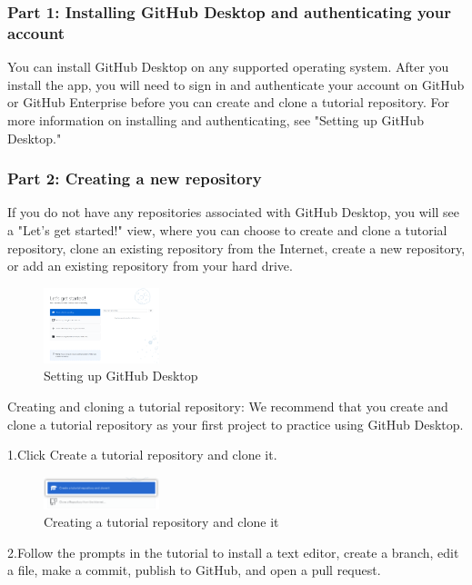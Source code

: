 \subsubsection{Part 1: Installing GitHub Desktop and authenticating your account}

You can install GitHub Desktop on any supported operating system. After you install the app, you will need to sign in and authenticate your account on GitHub or GitHub Enterprise before you can create and clone a tutorial repository.
For more information on installing and authenticating, see "Setting up GitHub Desktop."

\subsubsection{Part 2: Creating a new repository}

If you do not have any repositories associated with GitHub Desktop, you will see a "Let's get started!" view, where you can choose to create and clone a tutorial repository, clone an existing repository from the Internet, create a new repository, or add an existing repository from your hard drive.

\begin{figure}[ht]
    \centering
    \includegraphics[width=0.3\textwidth]{figures/Setting up GitHub Desktop.png}
    \caption{Setting up GitHub Desktop}
\end{figure}

Creating and cloning a tutorial repository:
We recommend that you create and clone a tutorial repository as your first project to practice using GitHub Desktop.

1.Click Create a tutorial repository and clone it.
\begin{figure}[ht]
    \centering
    \includegraphics[width=0.3\textwidth]{figures/Creating a tutorial repository and clone it.png}
    \caption{Creating a tutorial repository and clone it}
\end{figure}

2.Follow the prompts in the tutorial to install a text editor, create a branch, edit a file, make a commit, publish to GitHub, and open a pull request.





